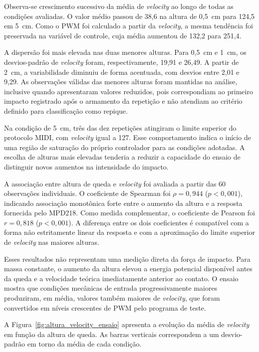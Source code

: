 Observa-se crescimento sucessivo da média de \textit{velocity} ao longo de todas as condições avaliadas. O valor médio passou de 38,6 na altura de 0,5~cm para 124,5 em 5~cm. Como o PWM foi calculado a partir da \textit{velocity}, a mesma tendência foi preservada na variável de controle, cuja média aumentou de 132,2 para 251,4.

A dispersão foi mais elevada nas duas menores alturas. Para 0,5~cm e 1~cm, os desvios-padrão de \textit{velocity} foram, respectivamente, 19,91 e 26,49. A partir de 2~cm, a variabilidade diminuiu de forma acentuada, com desvios entre 2,01 e 9,29. As observações válidas das menores alturas foram mantidas na análise, inclusive quando apresentaram valores reduzidos, pois correspondiam ao primeiro impacto registrado após o armamento da repetição e não atendiam ao critério definido para classificação como repique.

Na condição de 5~cm, três das dez repetições atingiram o limite superior do protocolo MIDI, com \textit{velocity} igual a 127. Esse comportamento indica o início de uma região de saturação do próprio controlador para as condições adotadas. A escolha de alturas mais elevadas tenderia a reduzir a capacidade do ensaio de distinguir novos aumentos na intensidade do impacto.

A associação entre altura de queda e \textit{velocity} foi avaliada a partir das 60 observações individuais. O coeficiente de Spearman foi $\rho=0{,}944$ ($p<0{,}001$), indicando associação monotônica forte entre o aumento da altura e a resposta fornecida pelo MPD218. Como medida complementar, o coeficiente de Pearson foi $r=0{,}818$ ($p<0{,}001$). A diferença entre os dois coeficientes é compatível com a forma não estritamente linear da resposta e com a aproximação do limite superior de \textit{velocity} nas maiores alturas.

Esses resultados não representam uma medição direta da força de impacto. Para massa constante, o aumento da altura elevou a energia potencial disponível antes da queda e a velocidade teórica imediatamente anterior ao contato. O ensaio mostra que condições mecânicas de entrada progressivamente maiores produziram, em média, valores também maiores de \textit{velocity}, que foram convertidos em níveis crescentes de PWM pelo programa de teste.

A Figura~\ref{fig:altura_velocity_ensaio} apresenta a evolução da média de \textit{velocity} em função da altura de queda. As barras verticais correspondem a um desvio-padrão em torno da média de cada condição.


